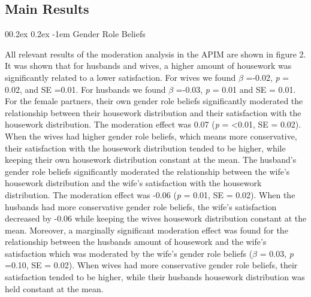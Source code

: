 \documentclass[
  man,floatsintext]{apa6}
\makeatletter
\let\oldparagraph\paragraph
\renewcommand{\paragraph}[1]{\oldparagraph{#1}\mbox{}}
\renewcommand{\paragraph}{\@startsection{paragraph}{4}{\parindent}%
  {0\baselineskip \@plus 0.2ex \@minus 0.2ex}%
  {-1em}%
  {\normalfont\normalsize\bfseries\itshape\typesectitle}}
\makeatother
\begin{document}
\hypertarget{main-results}{%
\subsection{Main Results}\label{main-results}}

\hypertarget{gender-role-beliefs}{%
\paragraph{Gender Role Beliefs}\label{gender-role-beliefs}}

All relevant results of the moderation analysis in the APIM are shown in figure 2. It was shown that for husbands and wives, a higher amount of housework was significantly related to a lower satisfaction. For wives we found \(\beta\) =-0.02, \emph{p} = 0.02, and SE =0.01. For husbands we found \(\beta\) =-0.03, \emph{p} = 0.01 and SE = 0.01.
For the female partners, their own gender role beliefs significantly moderated the relationship between their housework distribution and their satisfaction with the housework distribution. The moderation effect was 0.07 (\emph{p} = \textless0.01, SE = 0.02). When the wives had higher gender role beliefs, which means more conservative, their satisfaction with the housework distribution tended to be higher, while keeping their own housework distribution constant at the mean. The husband's gender role beliefs significantly moderated the relationship between the wife's housework distribution and the wife's satisfaction with the housework distribution. The moderation effect was -0.06 (\emph{p} = 0.01, SE = 0.02). When the husbands had more conservative gender role beliefs, the wife's satisfaction decreased by -0.06 while keeping the wives housework distribution constant at the mean. Moreover, a marginally significant moderation effect was found for the relationship between the husbands amount of housework and the wife's satisfaction which was moderated by the wife's gender role beliefs (\(\beta\) = 0.03, \emph{p} =0.10, SE = 0.02). When wives had more conservative gender role beliefs, their satisfaction tended to be higher, while their husbands housework distribution was held constant at the mean.
\end{document}
